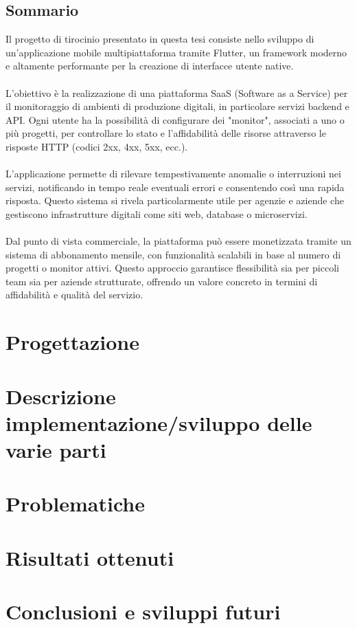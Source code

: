 \documentclass[12pt]{article}
\begin{document}
\begin{center}
\subsection*{Sommario}
\end{center}
Il progetto di tirocinio presentato in questa tesi consiste nello sviluppo di un’applicazione mobile multipiattaforma tramite Flutter, un framework moderno e altamente performante per la creazione di interfacce utente native.
\\\\ L'obiettivo è la realizzazione di una piattaforma SaaS (Software as a Service) per il monitoraggio di ambienti di produzione digitali, in particolare servizi backend e API. Ogni utente ha la possibilità di configurare dei "monitor", associati a uno o più progetti, per controllare lo stato e l'affidabilità delle risorse attraverso le risposte HTTP (codici 2xx, 4xx, 5xx, ecc.).
\\\\L'applicazione permette di rilevare tempestivamente anomalie o interruzioni nei servizi, notificando in tempo reale eventuali errori e consentendo così una rapida risposta. Questo sistema si rivela particolarmente utile per agenzie e aziende che gestiscono infrastrutture digitali come siti web, database o microservizi.
\\\\Dal punto di vista commerciale, la piattaforma può essere monetizzata tramite un sistema di abbonamento mensile, con funzionalità scalabili in base al numero di progetti o monitor attivi. Questo approccio garantisce flessibilità sia per piccoli team sia per aziende strutturate, offrendo un valore concreto in termini di affidabilità e qualità del servizio.

\newpage

\tableofcontents

\newpage


\newpage

\newpage
\section{\textbf{Progettazione}}
\newpage
\section{\textbf{Descrizione implementazione/sviluppo delle varie parti}}
\newpage
\section{\textbf{Problematiche}}
\newpage
\section{\textbf{Risultati ottenuti}}
\newpage
\section{\textbf{Conclusioni e sviluppi futuri}}
\end{document}
